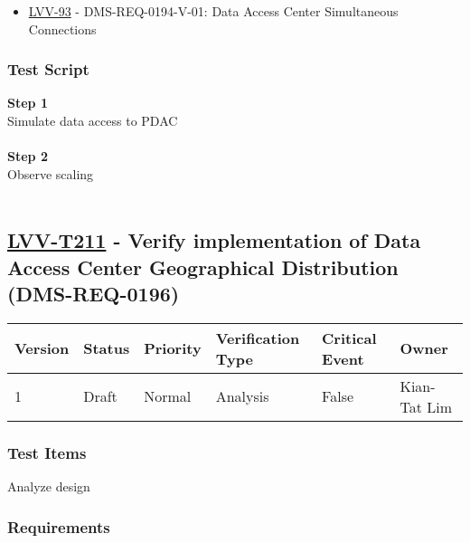 \begin{itemize}
\tightlist
\item
  \href{https://jira.lsstcorp.org/browse/LVV-93}{LVV-93} -
  DMS-REQ-0194-V-01: Data Access Center Simultaneous Connections
\end{itemize}

\hypertarget{test-script-110}{%
\subsubsection{Test Script}\label{test-script-110}}

\textbf{Step 1}\\
Simulate data access to PDAC\\
~\\
\textbf{Step 2}\\
Observe scaling\\
~\\

\hypertarget{lvv-t211---verify-implementation-of-data-access-center-geographical-distribution-dms-req-0196}{%
\subsection{\texorpdfstring{\href{https://jira.lsstcorp.org/secure/Tests.jspa\#/testCase/LVV-T211}{LVV-T211}
- Verify implementation of Data Access Center Geographical Distribution
(DMS-REQ-0196)}{LVV-T211 - Verify implementation of Data Access Center Geographical Distribution (DMS-REQ-0196)}}\label{lvv-t211---verify-implementation-of-data-access-center-geographical-distribution-dms-req-0196}}

\begin{longtable}[]{@{}llllll@{}}
\toprule
Version & Status & Priority & Verification Type & Critical Event &
Owner\tabularnewline
\midrule
\endhead
1 & Draft & Normal & Analysis & False & Kian-Tat Lim\tabularnewline
\bottomrule
\end{longtable}

\hypertarget{test-items-111}{%
\subsubsection{Test Items}\label{test-items-111}}

Analyze design

\hypertarget{requirements-111}{%
\subsubsection{Requirements}\label{requirements-111}}

